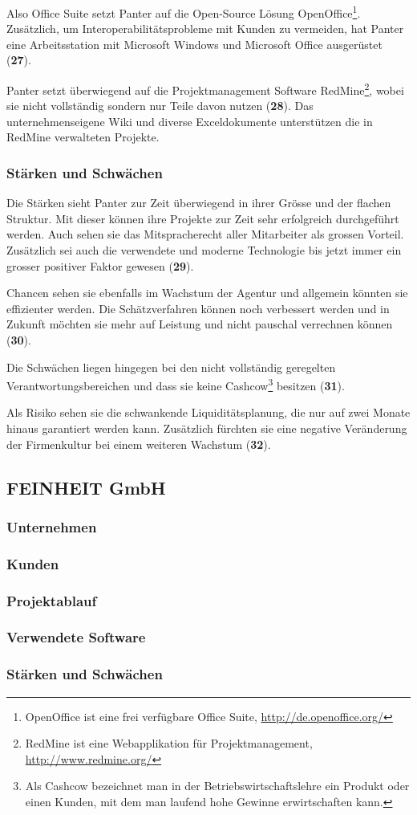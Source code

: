 Also Office Suite setzt Panter auf die Open-Source
Lösung OpenOffice\footnote{OpenOffice ist eine frei verfügbare Office Suite, 
\url{http://de.openoffice.org/}}. Zusätzlich, um Interoperabilitätsprobleme
mit Kunden zu vermeiden, hat Panter eine Arbeitsstation mit Microsoft Windows
und Microsoft Office ausgerüstet (\textbf{27}).

Panter setzt überwiegend auf die Projektmanagement Software RedMine\footnote{RedMine
ist eine Webapplikation für Projektmanagement, \url{http://www.redmine.org/}},
wobei sie nicht vollständig sondern nur Teile davon nutzen (\textbf{28}). 
Das unternehmenseigene Wiki und diverse Exceldokumente unterstützen die in RedMine
verwalteten Projekte. 

\subsubsection{Stärken und Schwächen}
Die Stärken sieht Panter zur Zeit überwiegend in ihrer Grösse und der flachen
Struktur. Mit dieser können ihre Projekte zur Zeit sehr erfolgreich durchgeführt 
werden. Auch sehen sie das Mitspracherecht aller Mitarbeiter als grossen Vorteil.
Zusätzlich sei auch die verwendete und moderne Technologie bis jetzt immer
ein grosser positiver Faktor gewesen (\textbf{29}).

Chancen sehen sie ebenfalls im Wachstum der Agentur und allgemein könnten
sie effizienter werden. Die Schätzverfahren können noch verbessert werden und
in Zukunft möchten sie mehr auf Leistung und nicht pauschal verrechnen können (\textbf{30}).

Die Schwächen liegen hingegen bei den nicht vollständig geregelten 
Verantwortungsbereichen und dass sie keine Cashcow\footnote{Als Cashcow bezeichnet
man in der Betriebswirtschaftslehre ein Produkt oder einen Kunden, mit dem man
laufend hohe Gewinne erwirtschaften kann.} besitzen (\textbf{31}).

Als Risiko sehen sie die schwankende Liquiditätsplanung, die nur auf zwei Monate 
hinaus garantiert werden kann. Zusätzlich fürchten sie eine negative Veränderung 
der Firmenkultur bei einem weiteren Wachstum (\textbf{32}).

\subsection{FEINHEIT GmbH}

\subsubsection{Unternehmen}

\subsubsection{Kunden}

\subsubsection{Projektablauf}

\subsubsection{Verwendete Software}

\subsubsection{Stärken und Schwächen}
